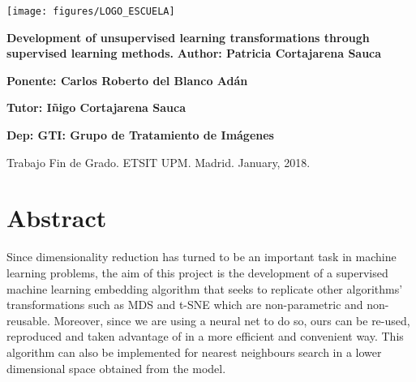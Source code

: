 \documentclass[a4paper,11pt,spanish]{report}
\begin{document}
\raggedbottom


\thispagestyle{empty}
\begin{flushright}
\texttt{[image: figures/LOGO\_ESCUELA]}
\end{flushright}
\vskip40mm
\begin{center}
\huge\textbf{Development of unsupervised learning transformations through supervised learning methods.}
\vskip2mm
\LARGE\textit{}
\vskip5mm
\Large\textbf{Author: Patricia Cortajarena Sauca}

\Large\textbf{Ponente: Carlos Roberto del Blanco Adán}

\Large\textbf{Tutor: Iñigo Cortajarena Sauca}

\Large\textbf{Dep: GTI: Grupo de Tratamiento de Imágenes}

\end{center}
\vfill
\begin{flushleft}
\large
Trabajo Fin de Grado.
ETSIT UPM.
Madrid. January, 2018.
\end{flushleft}

\chapter*{Abstract}
\setcounter{page}{3}

Since dimensionality reduction has turned to be an important task in machine learning problems, the aim of this project is the development of a supervised machine learning embedding algorithm that seeks to replicate other algorithms' transformations such as MDS and t-SNE which are non-parametric and non-reusable. Moreover, since we are using a neural net to do so, ours can be re-used, reproduced and taken advantage of in a more efficient and convenient way. This algorithm can also be implemented for nearest neighbours search in a lower dimensional space obtained from the model.
\end{document}
